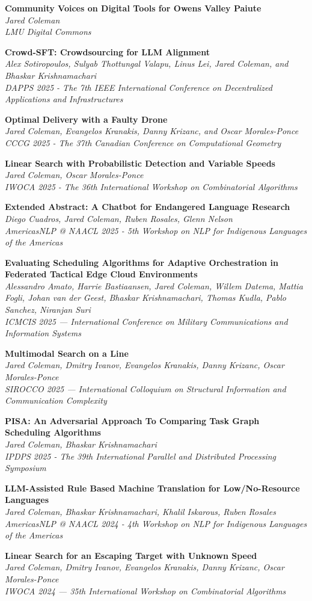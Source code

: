 \documentclass[letterpaper,11pt]{article}
\newcommand{\pub}[3]{
  \vspace{-1pt}\item \textbf{#1} \\ 
    \textit{\small#2} \\
    \textit{\small#3}\vspace{-5pt}
}
\begin{document}
    \pub
    {Community Voices on Digital Tools for Owens Valley Paiute}
    {Jared Coleman}
    {LMU Digital Commons}

    \pub
    {Crowd-SFT: Crowdsourcing for LLM Alignment}
    {Alex Sotiropoulos, Sulyab Thottungal Valapu, Linus Lei, Jared Coleman, and Bhaskar Krishnamachari}
    {DAPPS 2025 - The 7th IEEE International Conference on Decentralized Applications and Infrastructures}

    \pub
    {Optimal Delivery with a Faulty Drone}
    {Jared Coleman, Evangelos Kranakis, Danny Krizanc, and Oscar Morales-Ponce}
    {CCCG 2025 - The 37th Canadian Conference on Computational Geometry}

    \pub
    {Linear Search with Probabilistic Detection and Variable Speeds}
    {Jared Coleman, Oscar Morales-Ponce}
    {IWOCA 2025 - The 36th International Workshop on Combinatorial Algorithms}

    \pub
    {Extended Abstract: A Chatbot for Endangered Language Research}
    {Diego Cuadros, Jared Coleman, Ruben Rosales, Glenn Nelson}
    {AmericasNLP @ NAACL 2025 - 5th Workshop on NLP for Indigenous Languages of the Americas}

    \pub
    {Evaluating Scheduling Algorithms for Adaptive Orchestration in Federated Tactical Edge Cloud Environments}
    {Alessandro Amato, Harrie Bastiaansen, Jared Coleman, Willem Datema, Mattia Fogli, Johan van der Geest, Bhaskar Krishnamachari, Thomas Kudla, Pablo Sanchez, Niranjan Suri}
    {ICMCIS 2025 --- International Conference on Military Communications and Information Systems}

    \pub
    {Multimodal Search on a Line}
    {Jared Coleman, Dmitry Ivanov, Evangelos Kranakis, Danny Krizanc, Oscar Morales-Ponce}
    {SIROCCO 2025 --- International Colloquium on Structural Information and Communication Complexity}

    \pub
    {PISA: An Adversarial Approach To Comparing Task Graph Scheduling Algorithms}
    {Jared Coleman, Bhaskar Krishnamachari}
    {IPDPS 2025 - The 39th International Parallel and Distributed Processing Symposium}

    \pub
    {LLM-Assisted Rule Based Machine Translation for Low/No-Resource Languages}
    {Jared Coleman, Bhaskar Krishnamachari, Khalil Iskarous, Ruben Rosales}
    {AmericasNLP @ NAACL 2024 - 4th Workshop on NLP for Indigenous Languages of the Americas}

    \pub
    {Linear Search for an Escaping Target with Unknown Speed}
    {Jared Coleman, Dmitry Ivanov, Evangelos Kranakis, Danny Krizanc, Oscar Morales-Ponce}
    {IWOCA 2024 --- 35th International Workshop on Combinatorial Algorithms}
\end{document}
